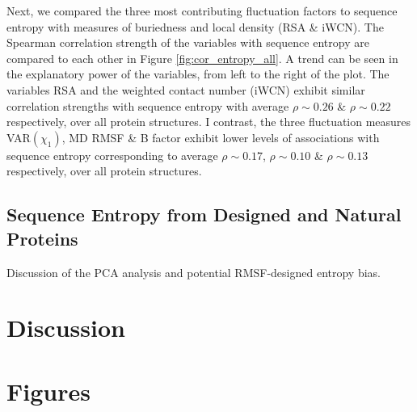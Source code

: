 \documentclass[12pt]{article}
\begin{document}
Next, we compared the three most contributing fluctuation factors to sequence entropy with measures of buriedness and local density (RSA \& iWCN). The Spearman correlation strength of the variables with sequence entropy are compared to each other in Figure \ref{fig:cor_entropy_all}. A trend can be seen in the explanatory power of the variables, from left to the right of the plot. The variables RSA and the weighted contact number (iWCN) exhibit similar correlation strengths with sequence entropy with average $\rho\sim0.26$ \& $\rho\sim0.22$ respectively, over all protein structures. I contrast, the three fluctuation measures VAR$(\chi_1)$, MD RMSF \& B factor exhibit lower levels of associations with sequence entropy corresponding to average $\rho\sim0.17$, $\rho\sim0.10$ \& $\rho\sim0.13$ respectively, over all protein structures.

\subsection*{Sequence Entropy from Designed and Natural Proteins}

            Discussion of the PCA analysis and potential RMSF-designed entropy bias.
	
    	
\section*{Discussion}





\newpage

\section*{Figures}
\end{document}
